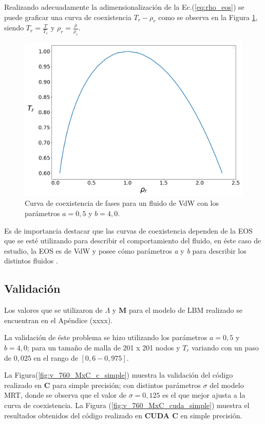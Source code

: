 Realizando adecuadamente la adimensionalización  de la Ec.(\ref{eq:rho_eos}) se puede graficar una curva de coexistencia $T_r - \rho_r$  como se observa en la Figura \ref{fig:T_r_rho_r_analitico}, siendo $T_r = \frac{T}{T_c}$ y $\rho_r = \frac{\rho}{\rho_c}$.

\begin{figure}[h!]
	\centering
	\includegraphics[width=.8\textwidth]{figs/cap4/Diagrama_T_r_vs_rho_r_analitico}
	\caption{Curva de coexistencia de fases para un fluido de VdW con los parámetros $a = 0,5 $ y $b = 4,0 $.}
	\label{fig:T_r_rho_r_analitico}	
\end{figure}

\newpage
Es de importancia destacar que las curvas de coexistencia dependen de la EOS que se esté utilizando para describir el comportamiento del fluido, en éste caso de estudio, la EOS es de VdW y posee  cómo parámetros \textit{a} y \textit{b} para describir los distintos fluidos .

\subsection{Validación}

Los valores que se utilizaron de $\Lambda$ y $\mathbf{M}$ para el modelo de LBM realizado se encuentran en el Apéndice (xxxx).

La validación de éste problema se hizo utilizando los parámetros $a =0,5$ y $b = 4,0$; para un tamaño de malla de 201 x 201 nodos y $T_r$ variando con un paso de $0,025$ en el rango de $[0,6 - 0,975]$. 

La Figura(\ref{fig:v_760_MxC_c_simple}) muestra la validación del código realizado en \textbf{C} para simple precisión; con distintos parámetros $\sigma$ del modelo MRT, donde se observa que el valor de $\sigma = 0,125$ es el que mejor ajusta a la curva de coexistencia. La Figura (\ref{fig:v_760_MxC_cuda_simple}) muestra el resultados obtenidos del código realizado en \textbf{CUDA C} en simple precisión.

